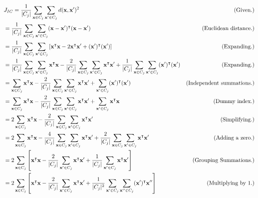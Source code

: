 \begin{solution}
    \tightalignbreak
    \begin{align*}
        &J_{IC} = \frac{1}{|C_j|} \sum_{\textbf{x} \in C_j}\sum_{\textbf{x}' \in C_j} d(\textbf{x}, \textbf{x}')^2 &\text{(Given.)}\\
        &= \frac{1}{|C_j|} \sum_{\textbf{x} \in C_j}\sum_{\textbf{x}' \in C_j} (\textbf{x} - \textbf{x}')\T (\textbf{x} - \textbf{x}') &\text{(Euclidean distance.)}\\
        &= \frac{1}{|C_j|} \sum_{\textbf{x} \in C_j}\sum_{\textbf{x}' \in C_j} \left[ \textbf{x}\T \textbf{x} - 2\textbf{x}\T \textbf{x}' + (\textbf{x}')\T (\textbf{x}')\right] &\text{(Expanding.)}\\
        &= \frac{1}{|C_j|} \sum_{\textbf{x} \in C_j}\sum_{\textbf{x}' \in C_j} \textbf{x}\T \textbf{x} - \frac{2}{|C_j|} \sum_{\textbf{x} \in C_j}\sum_{\textbf{x}' \in C_j}\textbf{x}\T \textbf{x}' + \frac{1}{|C_j|} \sum_{\textbf{x} \in C_j}\sum_{\textbf{x}' \in C_j} (\textbf{x}')\T (\textbf{x}') &\text{(Expanding.)}\\
        &= \sum_{\textbf{x} \in C_j} \textbf{x}\T \textbf{x} - \frac{2}{|C_j|} \sum_{\textbf{x} \in C_j}\sum_{\textbf{x}' \in C_j} \textbf{x}\T \textbf{x}' + \sum_{\textbf{x}' \in C_j} (\textbf{x}')\T (\textbf{x}') &\text{(Independent summations.)}\\ 
        &= \sum_{\textbf{x} \in C_j} \textbf{x}\T \textbf{x} - \frac{2}{|C_j|} \sum_{\textbf{x} \in C_j}\sum_{\textbf{x}' \in C_j} \textbf{x}\T \textbf{x}' + \sum_{\textbf{x}' \in C_j} \textbf{x}\T \textbf{x} &\text{(Dummy index.)}\\
        &= 2\sum_{\textbf{x} \in C_j} \textbf{x}\T \textbf{x} - \frac{2}{|C_j|} \sum_{\textbf{x} \in C_j}\sum_{\textbf{x}' \in C_j} \textbf{x}\T \textbf{x}' &\text{(Simplifying.)}\\
        &= 2\sum_{\textbf{x} \in C_j} \textbf{x}\T \textbf{x} - \frac{4}{|C_j|} \sum_{\textbf{x} \in C_j}\sum_{\textbf{x}' \in C_j} \textbf{x}\T \textbf{x}' + \frac{2}{|C_j|} \sum_{\textbf{x} \in C_j}\sum_{\textbf{x}' \in C_j} \textbf{x}\T \textbf{x}' &\text{(Adding a zero.)}\\
        &= 2\sum_{\textbf{x} \in C_j}\left[ \textbf{x}\T \textbf{x} - \frac{2}{|C_j|} \sum_{\textbf{x}' \in C_j} \textbf{x}\T \textbf{x}' + \frac{1}{|C_j|} \sum_{\textbf{x}' \in C_j} \textbf{x}\T \textbf{x}'\right] &\text{(Grouping Summations.)}\\
        &= 2\sum_{\textbf{x} \in C_j}\left[ \textbf{x}\T \textbf{x} - \frac{2}{|C_j|} \sum_{\textbf{x}' \in C_j} \textbf{x}\T \textbf{x}' + \frac{1}{|C_j|^2} \sum_{\textbf{x}' \in C_j} \sum_{\textbf{x}'' \in C_j} (\textbf{x}')\T \textbf{x}''\right] &\text{(Multiplying by 1.)}\\

\end{align*}
\end{solution}
